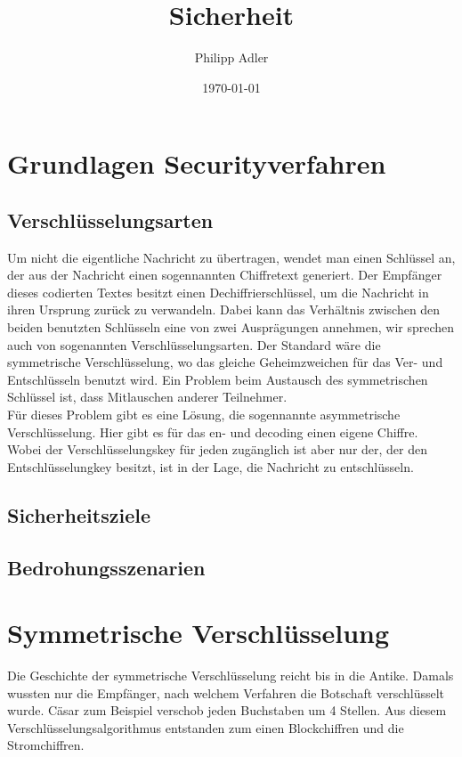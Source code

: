 \documentclass[11pt]{scrartcl}
\title{Sicherheit}
\author{Philipp Adler}
\date{\today{}}
\begin{document}
\maketitle
\tableofcontents
\pagebreak

\section{Grundlagen Securityverfahren}
\label{sec:basics-security-process}

\subsection{Verschlüsselungsarten}
\label{sec:ciphering types}
Um nicht die eigentliche Nachricht zu übertragen, wendet man einen Schlüssel an, der aus der Nachricht einen sogennannten Chiffretext generiert. Der Empfänger dieses codierten Textes besitzt einen Dechiffrierschlüssel, um die Nachricht in ihren Ursprung zurück zu verwandeln. \grqq{}Dabei kann das Verhältnis zwischen den beiden benutzten Schlüsseln eine von zwei Ausprägungen annehmen, wir sprechen auch von sogenannten Verschlüsselungsarten.\grqq{}\cite{5} Der Standard wäre die symmetrische Verschlüsselung, wo das gleiche Geheimzweichen für das Ver- und Entschlüsseln benutzt wird. Ein Problem beim Austausch des symmetrischen Schlüssel ist, dass Mitlauschen anderer Teilnehmer.\\
Für dieses Problem gibt es eine Lösung, die sogennannte asymmetrische Verschlüsselung. Hier gibt es für das en- und decoding einen eigene Chiffre. Wobei der Verschlüsselungskey für jeden zugänglich ist aber nur der, der den Entschlüsselungkey besitzt, ist in der Lage, die Nachricht zu entschlüsseln. \cite{1}

\subsection{Sicherheitsziele}
\label{sec:security goals}

\subsection{Bedrohungsszenarien}
\label{sec:threat scenarios}


\section{Symmetrische Verschlüsselung}
\label{sec:symetric-ciphering}
Die Geschichte der symmetrische Verschlüsselung reicht bis in die Antike. Damals wussten nur die Empfänger, nach welchem Verfahren die Botschaft verschlüsselt wurde. Cäsar zum Beispiel verschob jeden Buchstaben um 4 Stellen. Aus diesem Verschlüsselungsalgorithmus entstanden zum einen Blockchiffren und die Stromchiffren. \cite{1}
\end{document}
